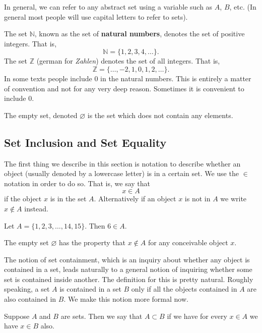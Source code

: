 In general, we can refer to any abstract set using a variable such as $A$, $B$, etc. (In general most people will use capital letters to refer to sets). 

\begin{example}
The set $\mathbb{N}$, known as the set of \textbf{natural numbers}, denotes the set of positive integers. That is,
\[\mathbb{N} = \{1, 2, 3, 4, \dots\}.\]
The set $\mathbb{Z}$ (german for \textit{Zahlen}) denotes the set of all integers. That is,
\[\mathbb{Z} = \{\dots, -2, 1, 0, 1, 2, \dots\}.\]
In some texts people include $0$ in the natural numbers. This is entirely a matter of convention and not for any very deep reason. Sometimes it is convenient to include $0$. 

The empty set, denoted $\varnothing$ is the set which does not contain any elements.
\end{example}

\subsection{Set Inclusion and Set Equality}

The first thing we describe in this section is notation to describe whether an object (usually denoted by a lowercase letter) is in a certain set. We use the $\in$ notation in order to do so. That is, we say that 
\[x \in A\]
if the object $x$ is in the set $A$. Alternatively if an object $x$ is not in $A$ we write $x \not\in A$ instead.

\begin{example}
Let $A = \{1, 2, 3, \dots, 14, 15\}$. Then $6 \in A$. 

The empty set $\varnothing$ has the property that $x \not\in A$ for any conceivable object $x$.
\end{example}

The notion of set containment, which is an inquiry about whether any object is contained in a set, leads naturally to a general notion of inquiring whether some set is contained inside another. The definition for this is pretty natural. Roughly speaking, a set $A$ is contained in a set $B$ only if all the objects contained in $A$ are also contained in $B$. We make this notion more formal now.

\begin{definition}
Suppose $A$ and $B$ are sets. Then we say that $A \subset B$ if we have for every $x \in A$ we have $x \in B$ also.
\end{definition}

